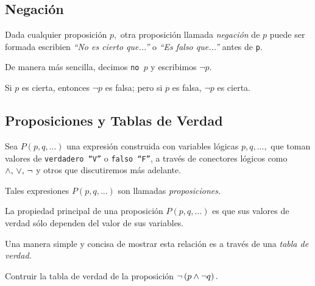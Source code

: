 \subsection{Negación}


 Dada cualquier proposición $p,$ otra proposición llamada \emph{negación} de $p$ puede ser formada escribien \emph{``No es cierto que...''} o \emph{``Es falso que...''} antes de \texttt{p}.
 
 De manera más sencilla, decimos \texttt{no $p$} y escribimos $\neg p.$
 
\begin{definicion}[Negación]
 Si $p$ es cierta, entonces $\neg p$ es falsa; pero si $p$ es falsa, $\neg p$ es cierta.
\end{definicion}
\subsection{Proposiciones y Tablas de Verdad}

 Sea $P(p,q,...)$ una expresión construida con variables lógicas $p,q,...,$ que toman valores de \texttt{verdadero ``V''} o \texttt{falso ``F''}, a través de conectores lógicos como $\wedge, \, \vee, \, \neg$ y otros  que discutiremos más adelante.
 
 Tales expresiones $P(p,q,...)$ son llamadas \emph{proposiciones.}

 La propiedad principal de una proposición $P(p,q,...)$ es que sus valores de verdad sólo dependen del valor de sus variables. 
 
 Una manera simple y concisa de mostrar esta relación es a través de una \emph{tabla de verdad.}

 \begin{resuelto}
  Contruir la tabla de verdad de la proposición
  $\neg \left( p \wedge \neg q \right).$

 \end{resuelto} 

